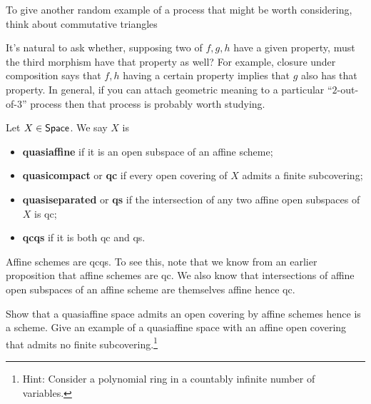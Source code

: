 \documentclass[11pt]{article}
\begin{document}
\begin{remark}
To give another random example of a process that might be worth considering, think about commutative triangles
\begin{center}
\end{center}
It's natural to ask whether, supposing two of $f,g,h$ have a given property, must the third morphism have that property as well? For example, closure under composition says that $f,h$ having a certain property implies that $g$ also has that property. In general, if you can attach geometric meaning to a particular ``$2$-out-of-$3$'' process then that process is probably worth studying.
\end{remark}

\begin{definition}
Let $X\in\operatorname{\mathsf{Space}}$. We say $X$ is
\begin{itemize}
\item \textbf{quasiaffine} if it is an open subspace of an affine scheme;

\item \textbf{quasicompact} or \textbf{qc} if every open covering of $X$ admits a finite subcovering;

\item \textbf{quasiseparated} or \textbf{qs} if the intersection of any two affine open subspaces of $X$ is qc;

\item \textbf{qcqs} if it is both qc and qs.
\end{itemize}
\end{definition}

\begin{example}
Affine schemes are qcqs. To see this, note that we know from an earlier proposition that affine schemes are qc. We also know that intersections of affine open subspaces of an affine scheme are themselves affine hence qc.
\end{example}

\begin{exercise}
Show that a quasiaffine space admits an open covering by affine schemes hence is a scheme. Give an example of a quasiaffine space with an affine open covering that admits no finite subcovering.\footnote{Hint: Consider a polynomial ring in a countably infinite number of variables.}
\end{exercise}
\end{document}
